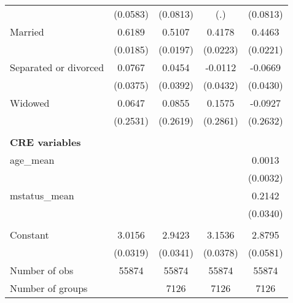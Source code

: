 {\begin{tabular}{l*{4}{c}}
                    &    (0.0583)         &    (0.0813)         &         (.)         &    (0.0813)         \\
Married             &      0.6189\sym{***}&      0.5107\sym{***}&      0.4178\sym{***}&      0.4463\sym{***}\\
                    &    (0.0185)         &    (0.0197)         &    (0.0223)         &    (0.0221)         \\
Separated or divorced&      0.0767\sym{*}  &      0.0454         &     -0.0112         &     -0.0669         \\
                    &    (0.0375)         &    (0.0392)         &    (0.0432)         &    (0.0430)         \\
Widowed             &      0.0647         &      0.0855         &      0.1575         &     -0.0927         \\
                    &    (0.2531)         &    (0.2619)         &    (0.2861)         &    (0.2632)         \\
\\ \textbf{CRE variables}&                     &                     &                     &                     \\
age\_mean            &                     &                     &                     &      0.0013         \\
                    &                     &                     &                     &    (0.0032)         \\
mstatus\_mean        &                     &                     &                     &      0.2142\sym{***}\\
                    &                     &                     &                     &    (0.0340)         \\
                    &                     &                     &                     &                     \\
Constant            &      3.0156\sym{***}&      2.9423\sym{***}&      3.1536\sym{***}&      2.8795\sym{***}\\
                    &    (0.0319)         &    (0.0341)         &    (0.0378)         &    (0.0581)         \\
\midrule
Number of obs       &       55874         &       55874         &       55874         &       55874         \\
Number of groups    &                     &        7126         &        7126         &        7126         \\

\end{tabular}}
